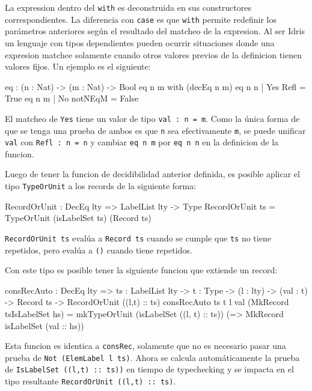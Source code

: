 La expression dentro del \texttt{with} es deconstruida en sus constructores correspondientes. La diferencia con \texttt{case} es que \texttt{with} permite redefinir los parámetros anteriores según el resultado del matcheo de la expresion. Al ser Idris un lenguaje con tipos dependientes pueden ocurrir situaciones donde una expresion matchee solamente cuando otros valores previos de la definicion tienen valores fijos. Un ejemplo es el siguiente:

\begin{code}
eq : (n : Nat) -> (m : Nat) -> Bool  
eq n m  with (decEq n m)
  eq n n | Yes Refl = True
  eq n m | No notNEqM = False
\end{code}

El matcheo de \texttt{Yes} tiene un valor de tipo \texttt{val : n = m}. Como la única forma de que se tenga una prueba de ambos es que \texttt{n} sea efectivamente \texttt{m}, se puede unificar \texttt{val} con \texttt{Refl : n = n} y cambiar \texttt{eq n m} por \texttt{eq n n} en la definicion de la funcion.


Luego de tener la funcion de decidibilidad anterior definida, es posible aplicar el tipo \texttt{TypeOrUnit} a los records de la siguiente forma:

\begin{code}
RecordOrUnit : DecEq lty => LabelList lty -> Type
RecordOrUnit ts = TypeOrUnit (isLabelSet ts) (Record ts)
\end{code}

\texttt{RecordOrUnit ts} evalúa a \texttt{Record ts} cuando se cumple que \texttt{ts} no tiene repetidos, pero evalúa a \texttt{()} cuando tiene repetidos.

Con este tipo es posible tener la siguiente funcion que extiende un record:

\begin{code}
consRecAuto : DecEq lty => {ts : LabelList lty} -> 
  {t : Type} -> (l : lty) -> (val : t) -> Record ts -> 
  RecordOrUnit ((l,t) :: ts)
consRecAuto {ts} {t} l val (MkRecord tsIsLabelSet hs) = 
  mkTypeOrUnit (isLabelSet ((l, t) :: ts)) 
  (\isLabelSet => MkRecord isLabelSet (val :: hs))
\end{code}

Esta funcion es identica a \texttt{consRec}, solamente que no es necesario pasar una prueba de \texttt{Not (ElemLabel l ts)}. Ahora se calcula automáticamente la prueba de \texttt{IsLabelSet ((l,t) :: ts))}  en tiempo de typechecking y se impacta en el tipo resultante \texttt{RecordOrUnit ((l,t) :: ts)}.

